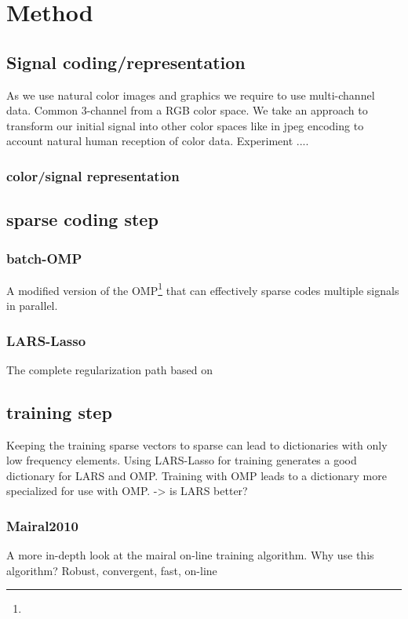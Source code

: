 \chapter{Method}


\section{Signal coding/representation}
As we use natural color images and graphics we require to use multi-channel data. Common 3-channel from a RGB color space.
We take an approach to transform our initial signal into other color spaces like in jpeg encoding to account natural human reception of
color data. 
Experiment ....
\subsection{color/signal representation}

\section{sparse coding step}
\subsection{batch-OMP}
A modified version of the OMP\footnote{} that can effectively sparse codes multiple signals in parallel.
\cite{Rubinstein2008}

\subsection{LARS-Lasso}
The complete regularization path based on \cite{Efron2004}

\section{training step}
Keeping the training sparse vectors to sparse can lead to dictionaries with only low frequency elements.
Using LARS-Lasso for training generates a good dictionary for LARS and OMP. Training with OMP leads to 
a dictionary more specialized for use with OMP. -> is LARS better?

\subsection{Mairal2010}
A more in-depth look at the mairal on-line training algorithm. 
Why use this algorithm? Robust, convergent, fast, on-line

